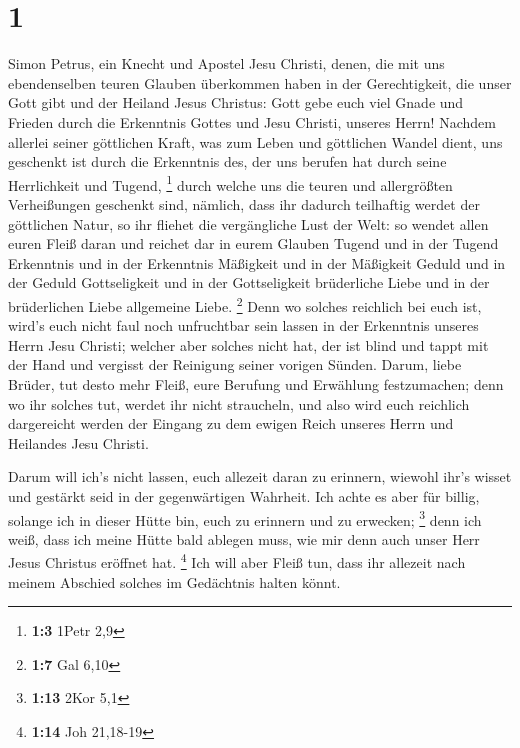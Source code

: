 \hypertarget{section}{%
\section{1}\label{section}}

 Simon Petrus, ein Knecht und Apostel Jesu Christi, denen,
die mit uns ebendenselben teuren Glauben überkommen haben in der
Gerechtigkeit, die unser Gott gibt und der Heiland Jesus Christus:
 Gott gebe euch viel Gnade und Frieden durch die
Erkenntnis Gottes und Jesu Christi, unseres Herrn! 
Nachdem allerlei seiner göttlichen Kraft, was zum Leben und göttlichen
Wandel dient, uns geschenkt ist durch die Erkenntnis des, der uns
berufen hat durch seine Herrlichkeit und Tugend, \footnote{\textbf{1:3}
  1Petr 2,9}  durch welche uns die teuren und allergrößten
Verheißungen geschenkt sind, nämlich, dass ihr dadurch teilhaftig werdet
der göttlichen Natur, so ihr fliehet die vergängliche Lust der Welt:
 so wendet allen euren Fleiß daran und reichet dar in
eurem Glauben Tugend und in der Tugend Erkenntnis  und in
der Erkenntnis Mäßigkeit und in der Mäßigkeit Geduld und in der Geduld
Gottseligkeit  und in der Gottseligkeit brüderliche Liebe
und in der brüderlichen Liebe allgemeine Liebe. \footnote{\textbf{1:7}
  Gal 6,10}  Denn wo solches reichlich bei euch ist,
wird's euch nicht faul noch unfruchtbar sein lassen in der Erkenntnis
unseres Herrn Jesu Christi;  welcher aber solches nicht
hat, der ist blind und tappt mit der Hand und vergisst der Reinigung
seiner vorigen Sünden.  Darum, liebe Brüder, tut desto
mehr Fleiß, eure Berufung und Erwählung festzumachen; denn wo ihr
solches tut, werdet ihr nicht straucheln,  und also wird
euch reichlich dargereicht werden der Eingang zu dem ewigen Reich
unseres Herrn und Heilandes Jesu Christi.

 Darum will ich's nicht lassen, euch allezeit daran zu
erinnern, wiewohl ihr's wisset und gestärkt seid in der gegenwärtigen
Wahrheit.  Ich achte es aber für billig, solange ich in
dieser Hütte bin, euch zu erinnern und zu erwecken; \footnote{\textbf{1:13}
  2Kor 5,1}  denn ich weiß, dass ich meine Hütte bald
ablegen muss, wie mir denn auch unser Herr Jesus Christus eröffnet hat.
\footnote{\textbf{1:14} Joh 21,18-19}  Ich will aber
Fleiß tun, dass ihr allezeit nach meinem Abschied solches im Gedächtnis
halten könnt.

